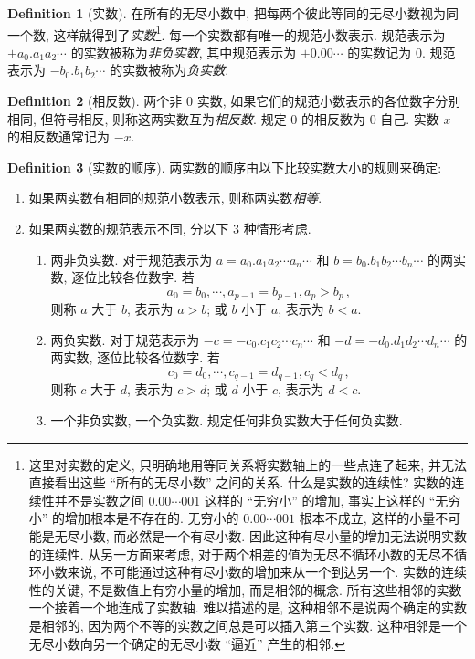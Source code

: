 \documentclass{book}
\numberwithin{equation}{section}
\numberwithin{figure}{section}
\theoremstyle{definition}
\newtheorem{definition}{Definition}
\newcommand{\dq}[1]{``#1''}
\begin{document}
\begin{definition}[实数]
  在所有的无尽小数中, 把每两个彼此等同的无尽小数视为同一个数, 这样就得到了\emph{实数}\footnote{这里对实数的定义, 只明确地用等同关系将实数轴上的一些点连了起来, 并无法直接看出这些 \dq{所有的无尽小数} 之间的关系. 什么是实数的连续性? 实数的连续性并不是实数之间 $0.00\cdots 001$ 这样的 \dq{无穷小} 的增加, 事实上这样的 \dq{无穷小} 的增加根本是不存在的. 无穷小的 $0.00\cdots 001$ 根本不成立, 这样的小量不可能是无尽小数, 而必然是一个有尽小数. 因此这种有尽小量的增加无法说明实数的连续性. 从另一方面来考虑, 对于两个相差的值为无尽不循环小数的无尽不循环小数来说, 不可能通过这种有尽小数的增加来从一个到达另一个. 实数的连续性的关键, 不是数值上有穷小量的增加, 而是相邻的概念. 所有这些相邻的实数一个接着一个地连成了实数轴. 难以描述的是, 这种相邻不是说两个确定的实数是相邻的, 因为两个不等的实数之间总是可以插入第三个实数. 这种相邻是一个无尽小数向另一个确定的无尽小数 \dq{逼近} 产生的相邻.}. 每一个实数都有唯一的规范小数表示. 规范表示为 $+a_0.a_1a_2\cdots$ 的实数被称为\emph{非负实数}, 其中规范表示为 $+0.00\cdots$ 的实数记为 $0$. 规范表示为 $-b_0.b_1b_2\cdots$ 的实数被称为\emph{负实数}.
\end{definition}
\begin{definition}[相反数]
    两个非 0 实数, 如果它们的规范小数表示的各位数字分别相同, 但符号相反, 则称这两实数互为\emph{相反数}. 规定 0 的相反数为 0 自己. 实数 $x$ 的相反数通常记为 $-x$.
\end{definition}

\begin{definition}[实数的顺序]
  两实数的顺序由以下比较实数大小的规则来确定:
  \begin{enumerate}
    \item 如果两实数有相同的规范小数表示, 则称两实数\emph{相等}.
    \item 如果两实数的规范表示不同, 分以下 3 种情形考虑.
      \begin{enumerate}
	\item 两非负实数.
      对于规范表示为 $a=a_0.a_1a_2\cdots a_n\cdots$ 和 $b=b_0.b_1b_2\cdots b_n\cdots$ 的两实数, 逐位比较各位数字. 若
      \begin{equation*}
	a_0=b_0,\cdots,a_{p-1}=b_{p-1},a_p>b_p\,,
      \end{equation*}
      则称 $a$ 大于 $b$, 表示为 $a>b$; 或 $b$ 小于 $a$, 表示为 $b<a$.
	\item 两负实数.
      对于规范表示为 $-c=-c_0.c_1c_2\cdots c_n\cdots$ 和 $-d=-d_0.d_1d_2\cdots d_n\cdots$ 的两实数, 逐位比较各位数字. 若
      \begin{equation*}
	c_0=d_0,\cdots,c_{q-1}=d_{q-1},c_q<d_q\,,
      \end{equation*}
      则称 $c$ 大于 $d$, 表示为 $c>d$; 或 $d$ 小于 $c$, 表示为 $d<c$.
	\item 一个非负实数, 一个负实数.
      规定任何非负实数大于任何负实数.
      \end{enumerate}
  \end{enumerate}
\end{definition}
\end{document}
